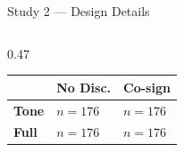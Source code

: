 \documentclass[10pt,aspectratio=169]{beamer}
\begin{document}
\begin{frame}{Study 2 --- Design Details}
\vspace{1pt}
\begin{columns}[T]
\scriptsize
\begin{column}{0.47\textwidth}
  \begin{keybox}
    \centering
    \scriptsize
    \renewcommand{\arraystretch}{1.4}
    \begin{tabular}{@{}l|>{\centering\arraybackslash}p{1.6cm}>{\centering\arraybackslash}p{1.6cm}@{}}
      & \textbf{No Disc.} & \textbf{Co-sign}\\
      \hline
      \textbf{Tone} & $n{=}176$ & $n{=}176$\\
      \textbf{Full} & $n{=}176$ & $n{=}176$\\
    \end{tabular}
    \vspace{4pt}


\end{keybox}
\end{column}
\end{columns}
\end{frame}
\end{document}
